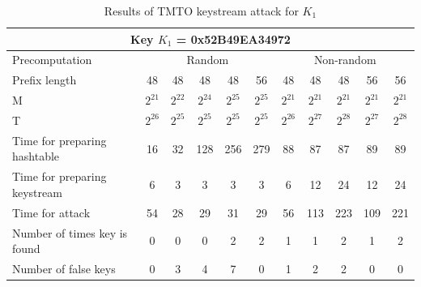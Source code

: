 \begin{table}[ht!]
\begin{center}
\begin{tabular}{|p{3cm}||c|c|c|c|c|c|c|c|c|c|}
\hline
\multicolumn{11}{|c|}{\textbf{Key $K_1$ = 0x52B49EA34972}} \\ \hline \hline
Precomputation 	& \multicolumn{5}{c|}{Random} & \multicolumn{5}{c|}{Non-random} \\ \hline
Prefix length										&	48 				&	48 				&	48 				&	48 				& 56 				&	48 				&	48				&	48 				&	56 				&	56  			\\ \hline
M																&	$2^{21}$ 	&	$2^{22}$ 	&	$2^{24}$ 	&	$2^{25}$ 	&	$2^{25}$ 	& $2^{21}$ 	&	$2^{21}$ 	&	$2^{21}$ 	&	$2^{21}$ 	& $2^{21}$	\\ \hline
T	  														&	$2^{26}$ 	&	$2^{25}$ 	&	$2^{25}$ 	&	$2^{25}$	&	$2^{25}$ 	& $2^{26}$ 	&	$2^{27}$ 	&	$2^{28}$ 	& $2^{27}$ 	& $2^{28}$	\\ \hline
Time for preparing hashtable		&	16 				&	32 				&	128				&	256				&	279 			& 88 				&	87				& 87				&	89	 			& 89				\\ \hline
Time for preparing keystream		&	6 				&	3 				&	3 				&	3 				&	3 				& 6 				&	12				& 24				&	12				& 24				\\ \hline
Time for attack									&	54 				&	28 				&	29 				&	31 				&	29 				& 56 				&	113				& 223				&	109				& 221				\\ \hline
Number of times key is found		&	0 				&	0 				&	0 				&	2 				&	2 				& 1 				&	1					& 2 				&	1 				& 2					\\ \hline
Number of false keys						&	0 				&	3 				&	4 				&	7 				&	0 				& 1  				&	2					& 2 				& 0 				& 0					\\ \hline
\end{tabular}
\end{center}
\caption{Results of TMTO keystream attack for $K_1$}
\label{tab:keystream-attack-results-key1}
\end{table}


